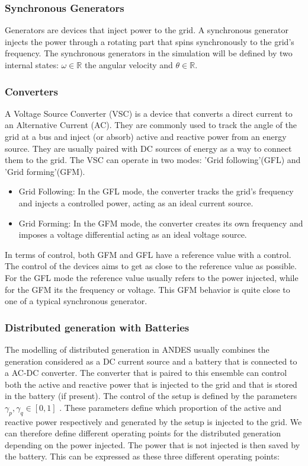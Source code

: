 \documentclass{report}
\begin{document}
\subsubsection*{Synchronous Generators}

Generators are devices that inject power to the grid. A synchronous generator injects the power through a rotating part that spins synchronously to the grid's frequency. The synchronous generators in the simulation will be defined by two internal states: $\omega \in \mathbb{R}$ the angular velocity and $\theta  \in \mathbb{R}$.  


\subsubsection*{Converters}

A Voltage Source Converter (VSC) is a device that converts a direct current to an Alternative Current (AC). They are commonly used to track the angle of the grid at a bus and inject (or absorb) active and reactive power from an energy source. They are usually paired with DC sources of energy as a way to connect them to the grid. The VSC can operate in two modes: 'Grid following'(GFL) and 'Grid forming'(GFM). 

\begin{itemize}
    \item Grid Following: In the GFL mode, the converter tracks the grid's frequency and injects a controlled power, acting as an ideal current source.
    \item Grid Forming: In the GFM mode, the converter creates its own frequency and imposes a voltage differential acting as an ideal voltage source.
\end{itemize}

In terms of control, both GFM and GFL have a reference value with a control. The control of the devices aims to get as close to the reference value as possible. For the GFL mode the reference value usually refers to the power injected, while for the GFM its the frequency or voltage. This GFM behavior is quite close to one of a typical synchronous generator.  

\subsubsection*{Distributed generation with Batteries}

The modelling of distributed generation in ANDES usually combines the generation considered as a DC current source and a battery that is connected to a AC-DC converter. The converter that is paired to this ensemble can control both the active and reactive power that is injected to the grid and that is stored in the battery (if present). The control of the setup is defined by the parameters $\gamma_p, \gamma_q \in [0,1]$ . These parameters define which proportion of the active and reactive power respectively and generated by the setup is injected to the grid. We can therefore define different operating points for the distributed generation depending on the power injected. The power that is not injected is then saved by the battery. This can be expressed as these three different operating points:
\end{document}
